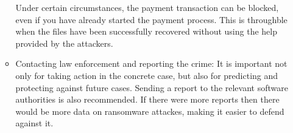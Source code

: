 \begin{itemize}
\begin{itemize}
Under certain circumstances, the payment transaction can be blocked, even if you have already started the payment process.
This is throughble when the files have been successfully recovered without using the help provided by the attackers.
		\item Contacting law enforcement and reporting the crime:
It is important not only for taking action in the concrete case, but also for predicting and protecting against future cases.
Sending a report to the relevant software authorities is also recommended.
If there were more reports then there would be more data on ransomware attackes, making it easier to defend against it.
	\end{itemize}
\end{itemize}



